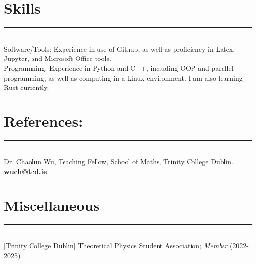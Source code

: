 \documentclass{article}
\begin{document}
\section*{Skills}
\hrule~\\
Software/Tools: Experience in use of Github, as well as proficiency in Latex, Jupyter, and Microsoft Office tools.\\
Programming: Experience in Python and C++, including OOP and parallel programming, as well as computing in a Linux environment. I am also learning Rust currently.
\section*{References:}
\hrule~\\
Dr. Chaolun Wu, Teaching Fellow, School of Maths, Trinity College Dublin. \textbf{wuch@tcd.ie}
\section*{Miscellaneous}
\hrule~\\
$[$Trinity College Dublin$]$ Theoretical Physics Student Association; \textit{Member} (2022-2025)
\end{document}
